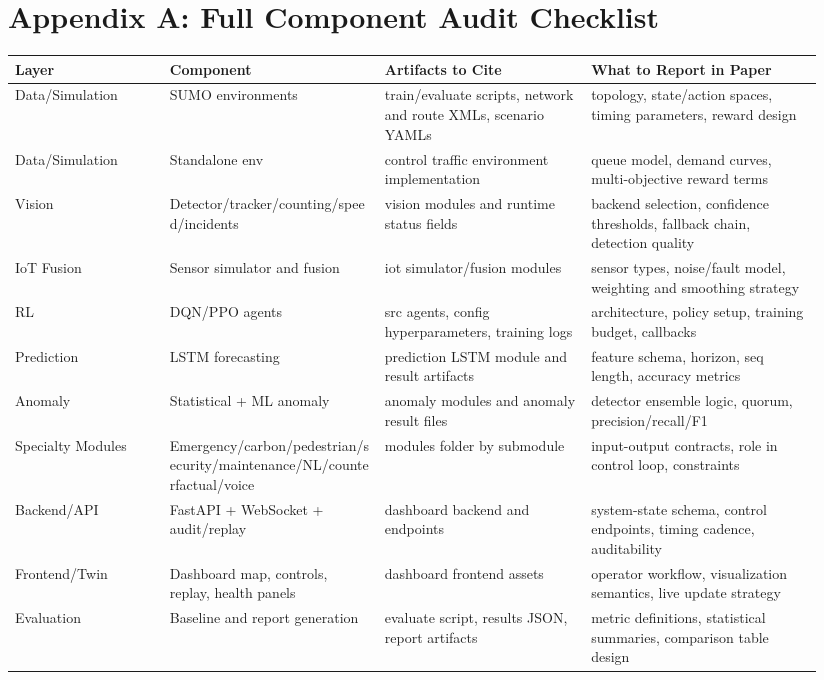 \documentclass[conference]{IEEEtran}
\begin{document}
\section*{Appendix A: Full Component Audit Checklist}
\renewcommand{\arraystretch}{1.15}
\begin{longtable}{p{0.18\linewidth} p{0.25\linewidth} p{0.24\linewidth} p{0.27\linewidth}}
\toprule
\textbf{Layer} & \textbf{Component} & \textbf{Artifacts to Cite} & \textbf{What to Report in Paper} \\
\midrule
\endhead
Data/Simulation & SUMO environments & train/evaluate scripts, network and route XMLs, scenario YAMLs & topology, state/action spaces, timing parameters, reward design \\
Data/Simulation & Standalone env & control traffic environment implementation & queue model, demand curves, multi-objective reward terms \\
Vision & Detector/tracker/counting/speed/incidents & vision modules and runtime status fields & backend selection, confidence thresholds, fallback chain, detection quality \\
IoT Fusion & Sensor simulator and fusion & iot simulator/fusion modules & sensor types, noise/fault model, weighting and smoothing strategy \\
RL & DQN/PPO agents & src agents, config hyperparameters, training logs & architecture, policy setup, training budget, callbacks \\
Prediction & LSTM forecasting & prediction LSTM module and result artifacts & feature schema, horizon, seq length, accuracy metrics \\
Anomaly & Statistical + ML anomaly & anomaly modules and anomaly result files & detector ensemble logic, quorum, precision/recall/F1 \\
Specialty Modules & Emergency/carbon/pedestrian/security/maintenance/NL/counterfactual/voice & modules folder by submodule & input-output contracts, role in control loop, constraints \\
Backend/API & FastAPI + WebSocket + audit/replay & dashboard backend and endpoints & system-state schema, control endpoints, timing cadence, auditability \\
Frontend/Twin & Dashboard map, controls, replay, health panels & dashboard frontend assets & operator workflow, visualization semantics, live update strategy \\
Evaluation & Baseline and report generation & evaluate script, results JSON, report artifacts & metric definitions, statistical summaries, comparison table design \\
\bottomrule
\end{longtable}
\end{document}
